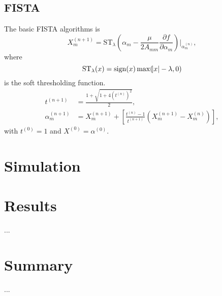 \documentclass[twocolumn]{aastex62}
\begin{document}
\subsection{FISTA}
The basic FISTA algorithms is
\begin{equation}
X^{(n+1)}_m=\mathrm{ST}_{\lambda} (\alpha_m -\frac{\mu}{2A_{mm}} \frac{\partial f}{\partial \alpha_m})|_{\alpha^{(n)}_m} ,
\end{equation}
where 
\begin{equation}
\mathrm{ST}_{\lambda} (x) = \mathrm{sign} (x) \max (\abs{x}-\lambda,0)
\end{equation}
is the soft thresholding function.
\begin{equation}
\begin{split}
t^{(n+1)} &= \frac{1+\sqrt{1+4(t^{(n)})^2}}{2},\\
\alpha^{(n+1)}_m&=X^{(n+1)}_m+[\frac{t^{(n)}-1}{t^{(n+1)}}(X^{(n+1)}_m-X^{(n)}_m)],
\end{split}
\end{equation}
with $t^{(0)}=1$ and $X^{(0)}=\alpha^{(0)}$.
\section{Simulation}


\section{Results}
...
\section{Summary}
...



\appendix
\end{document}
